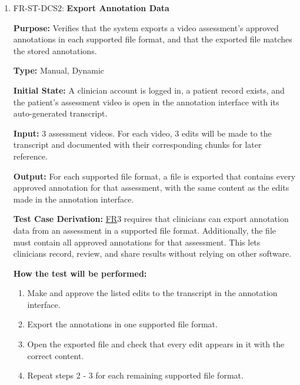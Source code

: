\documentclass[12pt, titlepage]{article}
\newcommand{\srsfr}[1]{\href{https://github.com/Nour-Fawaz/MacaBoca/blob/main/pdfs/SRS/SRS.pdf}{FR}}
\renewcommand{\_}{\oldunderscore\allowbreak}
\begin{document}
\begin{enumerate}
  \item FR-ST-DCS2: \textbf{Export Annotation Data\\}
  \begin{mdframed}[linewidth=0.5mm]
      \textbf{Purpose:} Verifies that the system exports a video assessment's approved annotations in each supported file format, and that the exported file matches the stored annotations. \par
      \textbf{Type:} Manual, Dynamic \par
      \textbf{Initial State:} A clinician account is logged in, a patient record exists, and the patient's assessment video is open in the annotation interface with its auto-generated transcript. \par
      \textbf{Input:} 3 assessment videos. For each video, 3 edits will be made to the transcript and documented with their corresponding chunks for later reference. \par
      \textbf{Output:} For each supported file format, a file is exported that contains every approved annotation for that assessment, with the same content as the edits made in the annotation interface. \par
      \textbf{Test Case Derivation:} \srsfr*{3} requires that clinicians can export annotation data from an assessment in a supported file format. Additionally, the file must contain all approved annotations for that assessment. This lets clinicians record, review, and share results without relying on other software.\par
      \textbf{How the test will be performed:}
      \begin{enumerate}
        \item[1.] Make and approve the listed edits to the transcript in the annotation interface.
        \item[2.] Export the annotations in one supported file format.
        \item[3.] Open the exported file and check that every edit appears in it with the correct content.
        \item[4.] Repeat steps 2 - 3 for each remaining supported file format.
\end{enumerate}
\end{mdframed}


\end{enumerate}
\end{document}
